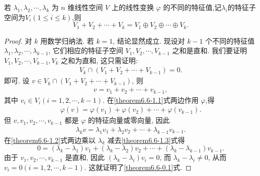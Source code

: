 \documentclass[../../main.tex]{subfiles}%
\begin{document}
\begin{theorem}\label{theorem:不同特征值的特征子空间的和必是直和}
若 $\lambda_1, \lambda_2, \cdots, \lambda_k$ 为 $n$ 维线性空间 $V$ 上的线性变换 $\varphi$ 的不同的特征值,记$\lambda_i$的特征子空间为$V_i(1\leqslant  i\leqslant  k)$,则
\[
V_1 + V_2 + \cdots + V_k = V_1 \oplus V_2 \oplus \cdots \oplus V_k.
\]
\end{theorem}
\begin{proof}
对 $k$ 用数学归纳法. 若 $k = 1$, 结论显然成立. 现设对 $k - 1$ 个不同的特征值 $\lambda_1, \lambda_2, \cdots, \lambda_{k-1}$, 它们相应的特征子空间 $V_1, V_2, \cdots, V_{k-1}$ 之和是直和. 我们要证明 $V_1, V_2, \cdots, V_{k-1}, V_k$ 之和为直和, 这只需证明:
\begin{align}\label{theorem6.6-0.1}
V_k \cap (V_1 + V_2 + \cdots + V_{k-1}) = 0.
\end{align}
即可. 设 $v \in V_k \cap (V_1 + V_2 + \cdots + V_{k-1})$, 则
\begin{align}\label{theorem6.6-1.1}
v = v_1 + v_2 + \cdots + v_{k-1},
\end{align}
其中 $v_i \in V_i (i = 1, 2,\cdots, k - 1)$. 在\eqref{theorem6.6-1.1}式两边作用 $\varphi$,得
\begin{align}\label{theorem6.6-1.2}
\varphi(v) = \varphi(v_1) + \varphi(v_2) + \cdots + \varphi(v_{k-1}).   
\end{align}
但 $v, v_1, v_2, \cdots, v_{k-1}$ 都是 $\varphi$ 的特征向量或零向量, 因此
\begin{align}\label{theorem6.6-1.3}
\lambda_k v = \lambda_1 v_1 + \lambda_2 v_2 + \cdots + \lambda_{k-1} v_{k-1}.    
\end{align}
在\eqref{theorem6.6-1.2}式两边乘以 $\lambda_k$ 减去\eqref{theorem6.6-1.3}式得
\[
0 = (\lambda_k - \lambda_1) v_1 + (\lambda_k - \lambda_2) v_2 + \cdots + (\lambda_k - \lambda_{k-1}) v_{k-1}.
\]
由于 $v_1, v_2, \cdots, v_{k-1}$ 是直和, 因此 $(\lambda_k - \lambda_i) v_i = 0$, 而 $\lambda_k - \lambda_i \neq 0$, 从而 $v_i = 0 (i = 1, 2, \cdots, k - 1)$. 这就证明了\eqref{theorem6.6-0.1}式.
\end{proof}
\end{document}
